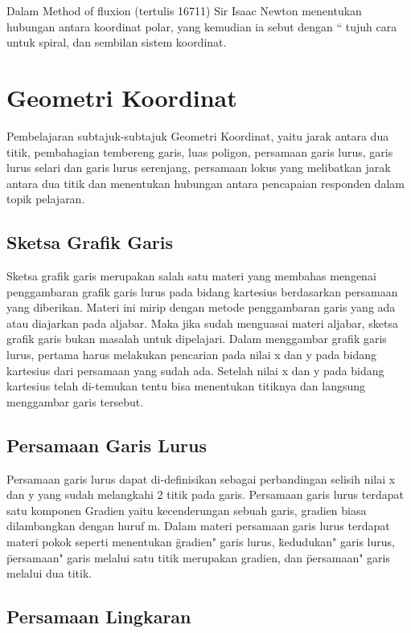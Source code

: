Dalam Method of fluxion (tertulis 16711) Sir Isaac Newton menentukan hubungan antara koordinat polar, yang kemudian ia sebut dengan “ tujuh cara untuk spiral, dan sembilan sistem koordinat. 

\section{Geometri Koordinat}

 Pembelajaran subtajuk-subtajuk Geometri Koordinat, yaitu jarak antara dua titik, pembahagian tembereng garis, luas poligon, persamaan garis lurus, garis lurus selari dan garis lurus serenjang, persamaan lokus yang melibatkan jarak antara dua titik dan menentukan hubungan antara pencapaian responden dalam topik pelajaran\cite{shong2013analisis}.

 
 \subsection{Sketsa Grafik Garis}
 Sketsa grafik garis merupakan salah satu materi yang membahas mengenai penggambaran grafik garis lurus pada bidang kartesius berdasarkan persamaan yang diberikan. Materi ini mirip dengan metode penggambaran garis yang ada atau diajarkan pada aljabar. Maka jika sudah menguasai materi aljabar, sketsa grafik garis bukan masalah untuk dipelajari. Dalam menggambar grafik garis lurus, pertama harus melakukan pencarian pada nilai x dan y pada bidang kartesius dari persamaan yang sudah ada. Setelah nilai x dan y pada bidang kartesius telah di-temukan tentu bisa menentukan titiknya dan langsung menggambar garis tersebut.
 
 \subsection{Persamaan Garis Lurus}
 Persamaan garis lurus dapat di-definisikan sebagai perbandingan selisih nilai x dan y yang sudah melangkahi 2 titik pada garis. 
 Persamaan garis lurus terdapat satu komponen Gradien yaitu kecenderungan sebuah garis, gradien biasa dilambangkan dengan huruf m.
 Dalam materi persamaan garis lurus terdapat materi pokok seperti menentukan \"gradien" garis lurus, \"kedudukan" garis lurus,
 \"persamaan" garis melalui satu titik merupakan gradien, dan \"persamaan" garis melalui dua titik.
 
 \subsection{Persamaan Lingkaran}


